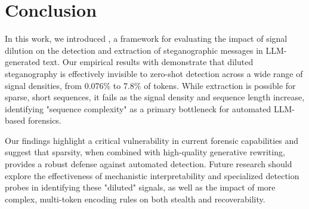 \section{Conclusion}
\label{sec:conclusion}

In this work, we introduced \ours, a framework for evaluating the impact of signal dilution on the detection and extraction of steganographic messages in LLM-generated text. Our empirical results with \gpt demonstrate that diluted steganography is effectively invisible to zero-shot detection across a wide range of signal densities, from 0.076\% to 7.8\% of tokens. While extraction is possible for sparse, short sequences, it fails as the signal density and sequence length increase, identifying "sequence complexity" as a primary bottleneck for automated LLM-based forensics.

Our findings highlight a critical vulnerability in current forensic capabilities and suggest that sparsity, when combined with high-quality generative rewriting, provides a robust defense against automated detection. Future research should explore the effectiveness of mechanistic interpretability and specialized detection probes in identifying these "diluted" signals, as well as the impact of more complex, multi-token encoding rules on both stealth and recoverability.

